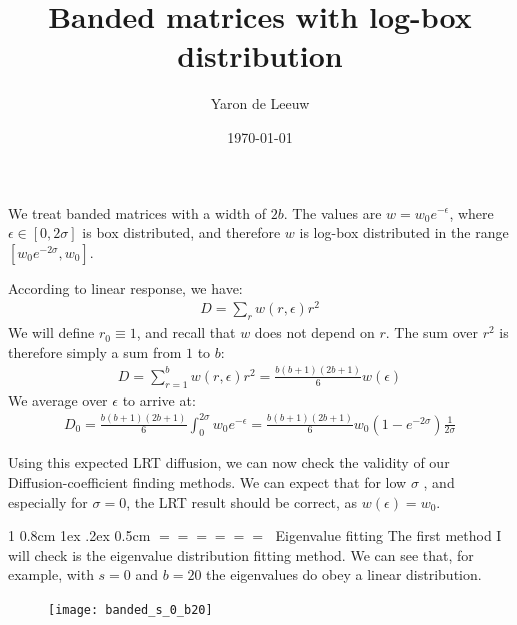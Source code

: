 \documentclass[onecolumn,fleqn,notitlepage,secnumarabic]{revtex4}
\makeatletter
\def\section{%
  \@startsection
    {section}%
    {1}%
    {\z@}%
    {0.8cm \@plus1ex \@minus .2ex}%
    {0.5cm}%
    {\Large\bf $=\!=\!=\!=\!=\!=\;$}%
}%
\makeatother
\begin{document}
\title{Banded matrices with log-box distribution}

\author{Yaron de Leeuw}
\date{\today}
\maketitle

We treat banded matrices with a width of $2b$. The values 
are $w = w_0e^{-\epsilon}$, where $\epsilon \in [0,2\sigma]$ is box distributed,
and therefore $w$ is log-box distributed in the range $[w_0e^{-2\sigma}, w_0]$.


According to linear response, we have:
\begin{align}
   D= \sum_r w(r,\epsilon)r^2
\end{align}
We will define $r_0\equiv 1$, and recall that $w$ does not depend on $r$.
The sum over $r^2$ is therefore simply a sum from $1$ to $b$:
\begin{align}
   D= \sum_{r=1}^b w(r,\epsilon) r^2 = \frac{b(b+1)(2b+1)}{6} w(\epsilon)
\end{align}
We average over $\epsilon$ to arrive at:
\begin{align}
   D_0 = \frac{b(b+1)(2b+1)}{6} \int_0^{2\sigma} w_0e^{-\epsilon} = \frac{b(b+1)(2b+1)}{6} w_0\left(1-e^{-2\sigma}\right)\frac{1}{2\sigma}
\end{align}

Using this expected LRT diffusion, we can now check the validity of our Diffusion-coefficient finding methods. 
We can expect that for low $\sigma$ , and especially for $\sigma=0$, the LRT result should be correct, as $w(\epsilon)=w_0$.

\section{Eigenvalue fitting}
The first method I will check is the eigenvalue distribution fitting method. We can see that, for example, with $s=0$ and $b=20$ the eigenvalues do obey a linear distribution.
\begin{figure}[H]
\texttt{[image: banded\_s\_0\_b20]}
\end{figure} 
\end{document}
